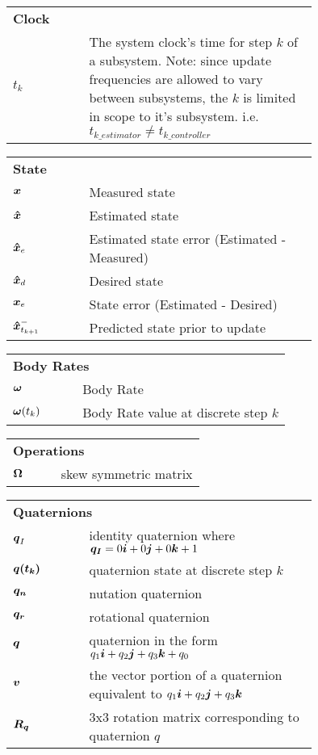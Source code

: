 \documentclass[11pt,doublespace]{unhthesis}
\begin{document}
\begin{nomenclature}

  \begin{tabular}{lp{0.75\linewidth}}
    \multicolumn{2}{l}{\textbf{Clock}} \\
    $t_k$ & The system clock's time for step $k$ of a subsystem.  Note: since update frequencies are allowed to vary between subsystems, the $k$ is limited in scope to it's subsystem.  i.e. $t_{k\_estimator} \ne t_{k\_controller}$ \\
  \end{tabular}

  \begin{tabular}{lp{0.75\linewidth}}
    \multicolumn{2}{l}{\textbf{State}} \\
    $\boldsymbol{x}$ & Measured state \\
    $\boldsymbol{\hat{x}}$ & Estimated state \\
    $\boldsymbol{\hat{x}}_e$ & Estimated state error (Estimated - Measured)\\
    $\boldsymbol{\hat{x}}_d$ & Desired state \\
    $\boldsymbol{x}_e$ & State error (Estimated - Desired) \\
    $\boldsymbol{\hat{x}}_{t_{k+1}}^-$ & Predicted state prior to update \\
  \end{tabular}

  \begin{tabular}{lp{0.75\linewidth}}
    \multicolumn{2}{l}{\textbf{Body Rates}} \\
    $\boldsymbol{\omega}$ & Body Rate \\
    $\boldsymbol{\omega}(t_k)$ & Body Rate value at discrete step $k$\\
  \end{tabular}


  \begin{tabular}{lp{0.75\linewidth}}
    \multicolumn{2}{l}{\textbf{Operations}} \\
    $\boldsymbol{\Omega}$ & skew symmetric matrix \\
  \end{tabular}

  \begin{tabular}{lp{0.75\linewidth}}
    \multicolumn{2}{l}{\textbf{Quaternions}} \\
    $\boldsymbol{q}_I$ & identity quaternion where $\boldsymbol{q_I} = 0\boldsymbol{i}+0\boldsymbol{j}+0\boldsymbol{k}+1$ \\
    $\boldsymbol{q(t_k)}$ & quaternion state at discrete step $k$ \\
    $\boldsymbol{q_n}$ & nutation quaternion \\
    $\boldsymbol{q_r}$ & rotational quaternion \\
    $\boldsymbol{q}$ & quaternion in the form $q_1\boldsymbol{i}+q_2\boldsymbol{j}+q_3\boldsymbol{k}+q_0$ \\
    $\boldsymbol{v}$ & the vector portion of a quaternion equivalent to $q_1\boldsymbol{i}+q_2\boldsymbol{j}+q_3\boldsymbol{k}$ \\
    $\boldsymbol{R_q}$ & 3x3 rotation matrix corresponding to quaternion $q$ \\
  \end{tabular}


\end{nomenclature}
\end{document}
